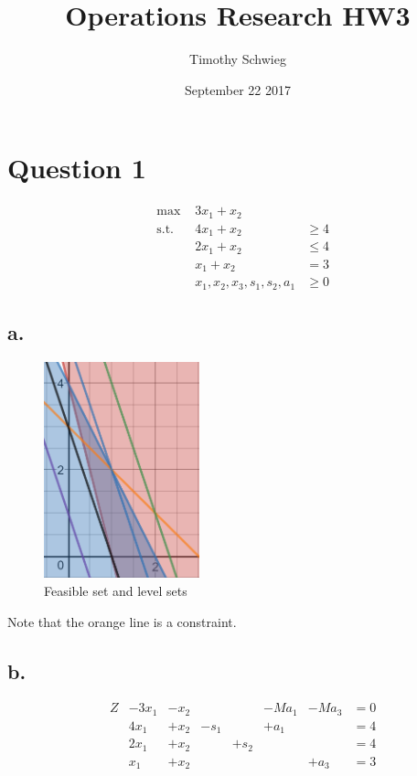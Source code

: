 \documentclass[10pt, letterpaper]{paper}
\title{ Operations Research HW3 }
\author{ Timothy Schwieg }
\date{ September 22 2017 }
\begin{document}
\maketitle

\section*{Question 1 }

\begin{equation*}
\begin{alignedat}{3}
&\text{max }&3x_1 + x_2&\\
&\text{s.t. } &4x_1 + x_2  &\geq 4\\
& &2x_1 + x_2  &\leq 4\\
& &x_1 + x_2 &= 3\\
& &x_1, x_2, x_3, s_1, s_2, a_1 &\geq 0
\end{alignedat}
\end{equation*}

\subsection*{a.}
\begin{figure}[h!]
\centering
\includegraphics[width=0.4\textwidth]{desmos-graph__3_.png}
\caption{ Feasible set and level sets }

\end{figure}
Note that the orange line is a constraint.

\subsection*{b.}
\begin{equation*}
\begin{alignedat}{10}
&Z &- 3x_1 &- x_2 &  & &-Ma_1 &-Ma_3&= 0\\
& &4x_1 &+ x_2 &-s_1 & &+a_1 & &=4\\
& &2x_1 &+ x_2 & &+s_2 & &  &= 4\\
& &x_1 &+ x_2 & & & &+a_3 &= 3\\
\end{alignedat}
\end{equation*}
\end{document}
